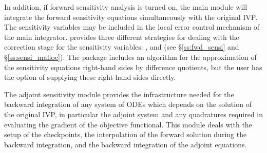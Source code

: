 In addition, if forward sensitivity analysis is turned on, the main module 
will integrate the forward sensitivity equations simultaneously with the original
IVP. The sensitivity variables may be included in the local error control
mechanism of the main integrator.
{\cvodes} provides three different strategies for dealing with the correction
stage for the sensitivity variables: ,  and
 (see \S\ref{ss:fwd_sensi} and \S\ref{ss:sensi_malloc}).
The {\cvodes} package includes an algorithm for the approximation of the
sensitivity equations right-hand sides by difference quotients, but the user has
the option of supplying these right-hand sides directly.

The adjoint sensitivity module provides the infrastructure needed for the 
backward integration of any system of ODEs which depends on the solution 
of the original IVP, in particular the adjoint system and any quadratures required
in evaluating the gradient of the objective functional.  This module deals with
the setup of the checkpoints, the interpolation of the forward solution during
the backward integration, and the backward integration of the adjoint equations.


